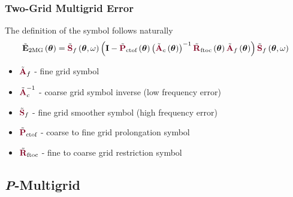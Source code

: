 \documentclass{beamer}
\begin{document}
\begin{frame}
\begin{center}
\frametitle{Two-Grid Multigrid Error}

The definition of the symbol follows naturally\\

\begin{equation}
\tilde{\mathbf{E}}_{\text{2MG}} \left( \boldsymbol{\theta} \right) = \tilde{{\color{burgundy}\mathbf{S}}}_f \left( \boldsymbol{\theta}, \omega \right) \left( \mathbf{I} - \tilde{{\color{burgundy}\mathbf{P}}}_{\text{ctof}} \left( \boldsymbol{\theta} \right) \left(\tilde{{\color{burgundy}\mathbf{A}}}_c \left( \boldsymbol{\theta} \right) \right)^{-1} \tilde{{\color{burgundy}\mathbf{R}}}_{\text{ftoc}} \left( \boldsymbol{\theta} \right) \tilde{{\color{burgundy}\mathbf{A}}}_f \left( \boldsymbol{\theta} \right) \right) \tilde{{\color{burgundy}\mathbf{S}}}_f \left( \boldsymbol{\theta}, \omega \right)
\end{equation}

\begin{itemize}

\item $\tilde{{\color{burgundy}\mathbf{A}}}_f$ - fine grid symbol

\item $\tilde{{\color{burgundy}\mathbf{A}}}_c^{-1}$ - coarse grid symbol inverse (low frequency error)

\item $\tilde{{\color{burgundy}\mathbf{S}}}_f$ - fine grid smoother symbol (high frequency error)

\item $\tilde{{\color{burgundy}\mathbf{P}}}_{\text{ctof}}$ - coarse to fine grid prolongation symbol

\item $\tilde{{\color{burgundy}\mathbf{R}}}_{\text{ftoc}}$ - fine to coarse grid restriction symbol

\end{itemize}

\end{center}
\end{frame}


\subsection{{\textit P}-Multigrid}
\end{document}
